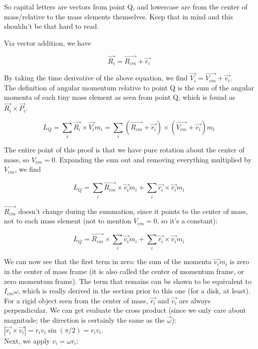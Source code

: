 So capital letters are vectors from point Q, and lowercase are from the center of mass/relative to the mass elements themselves. Keep that in mind and this shouldn't be that hard to read.


Via vector addition, we have

\begin{equation}
\vec{R_i} = \vec{R_{cm}} + \vec{r_i}
\end{equation}

By taking the time derivative of the above equation, we find $\vec{V_i} = \vec{V_{cm}} + \vec{v_i}$.\\
The definition of angular momentum relative to point Q is the sum of the angular momenta of each tiny mass element as seen from point Q, which is found as $\vec{R_i} \times \vec{P_i}$.

\begin{equation}
L_Q = \sum_i \vec{R_i} \times \vec{V_i} m_i = \sum_i (\vec{R_{cm}} + \vec{r_i}) \times (\vec{V_{cm}} + \vec{v_i}) m_i
\end{equation}

The entire point of this proof is that we have pure rotation about the center of mass, so $V_{cm} = 0$. Expanding the sum out and removing everything multiplied by $V_{cm}$, we find

\begin{equation}
L_Q = \sum_i \vec{R_{cm}} \times \vec{v_i} m_i + \sum_i \vec{r_i} \times \vec{v_i} m_i
\end{equation}

$\vec{R_{cm}}$ doesn't change during the summation, since it points to the center of mass, not to each mass element (not to mention $V_{cm} = 0$, so it's a constant):

\begin{equation}
L_Q = \vec{R_{cm}} \times \sum_i \vec{v_i} m_i + \sum_i \vec{r_i} \times \vec{v_i} m_i
\end{equation}

We can now see that the first term in zero: the sum of the momenta $\vec{v_i} m_i$ is zero in the center of mass frame (it is also called the center of momentum frame, or zero momentum frame). The term that remains can be shown to be equivalent to $I_{cm} \omega$, which is really derived in the section prior to this one (for a disk, at least).\\ 
For a rigid object seen from the center of mass, $\vec{r_i}$ and $\vec{v_i}$ are always perpendicular. We can get evaluate the cross product (since we only care about magnitude; the direction is certainly the same as the $\vec{\omega}$): $|\vec{r_i} \times \vec{v_i}| = r_i v_i \sin (\pi/2) = r_i v_i$.\\
Next, we apply $v_i = \omega r_i$:

